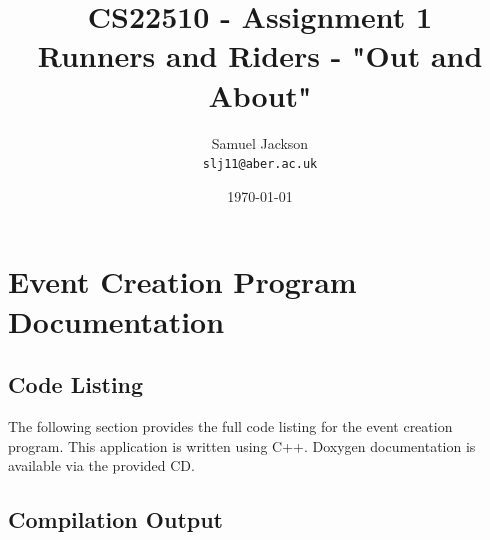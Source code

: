 \documentclass{article}
\begin{document}
\title{CS22510 - Assignment 1 \\ Runners and Riders - "Out and About"}
\author{Samuel Jackson \\ \texttt{slj11@aber.ac.uk}}
\date{\today}
\maketitle

\section{Event Creation Program Documentation}

\subsection{Code Listing}
The following section provides the full code listing for the event creation program. This application is written using C++. Doxygen documentation is available via the provided CD.




















\subsection{Compilation Output}
\end{document}
